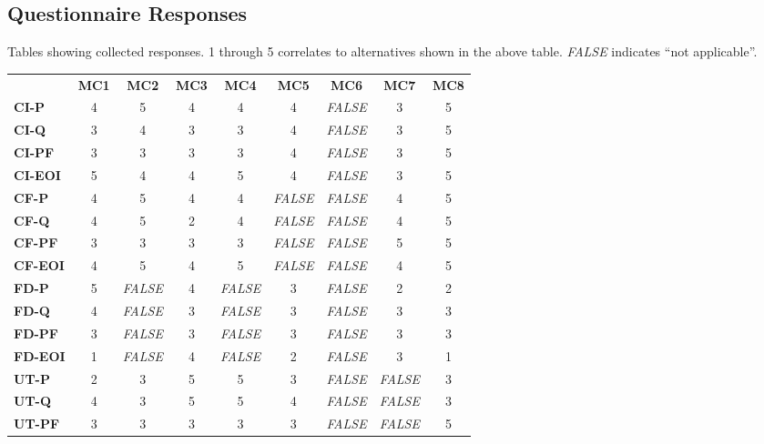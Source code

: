 \documentclass[final_report_innit.tex]{subfiles}
\begin{document}
\subsection{Questionnaire Responses}
Tables showing collected responses. 1 through 5 correlates to alternatives shown in the above table. \textit{FALSE} indicates ``not applicable''.

\begin{center}
\begin{tabular}[b]{l | c | c | c | c | c | c | c | c}
	& \textbf{MC1} & \textbf{MC2} & \textbf{MC3} & \textbf{MC4} & \textbf{MC5} & \textbf{MC6} & \textbf{MC7} & \textbf{MC8} \\ %
	\textbf{CI-P} & 4 & 5 & 4 & 4 & 4 & \textit{FALSE} & 3 & 5 \\ %
	\textbf{CI-Q} & 3 & 4 & 3 & 3 & 4 & \textit{FALSE} & 3 & 5 \\ %
	\textbf{CI-PF} & 3 & 3 & 3 & 3 & 4 & \textit{FALSE} & 3 & 5 \\ %
	\textbf{CI-EOI} & 5 & 4 & 4 & 5 & 4 & \textit{FALSE} & 3 & 5 \\ %
	\textbf{CF-P} & 4 & 5 & 4 & 4 & \textit{FALSE} & \textit{FALSE} & 4 & 5 \\ %
	\textbf{CF-Q} & 4 & 5 & 2 & 4 & \textit{FALSE} & \textit{FALSE} & 4 & 5 \\ %
	\textbf{CF-PF} & 3 & 3 & 3 & 3 & \textit{FALSE} & \textit{FALSE} & 5 & 5 \\ %
	\textbf{CF-EOI} & 4 & 5 & 4 & 5 & \textit{FALSE} & \textit{FALSE} & 4 & 5 \\ %
	\textbf{FD-P} & 5 & \textit{FALSE} & 4 & \textit{FALSE} & 3 & \textit{FALSE} & 2 & 2 \\ %
	\textbf{FD-Q} & 4 & \textit{FALSE} & 3 & \textit{FALSE} & 3 & \textit{FALSE} & 3 & 3 \\ %
	\textbf{FD-PF} & 3 & \textit{FALSE} & 3 & \textit{FALSE} & 3 & \textit{FALSE} & 3 & 3 \\ %
	\textbf{FD-EOI} & 1 & \textit{FALSE} & 4 & \textit{FALSE} & 2 & \textit{FALSE} & 3 & 1 \\ %
	\textbf{UT-P} & 2 & 3 & 5 & 5 & 3 & \textit{FALSE} & \textit{FALSE} & 3 \\ %
	\textbf{UT-Q} & 4 & 3 & 5 & 5 & 4 & \textit{FALSE} & \textit{FALSE} & 3 \\ %
	\textbf{UT-PF} & 3 & 3 & 3 & 3 & 3 & \textit{FALSE} & \textit{FALSE} & 5 \\ %

\end{tabular}
\end{center}
\end{document}
